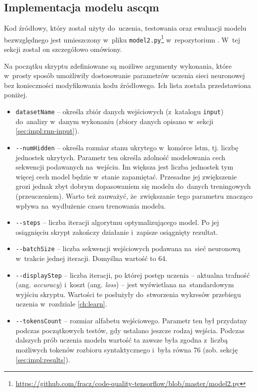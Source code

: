 \documentclass[twoside]{praca}
\begin{document}
\subsection{Implementacja modelu \gls{ascqm}}

\label{sec:impl:rnn:ascqm}

Kod źródłowy, który został użyty do~uczenia, testowania oraz ewaluacji modelu bezwzględnego jest umieszczony w~pliku \texttt{model2.py}\footnote{\url{https://github.com/fracz/code-quality-tensorflow/blob/master/model2.py}} w~repozytorium \cite{fracz:code-quality-tf}. W~tej sekcji został on szczegółowo omówiony.

Na początku skryptu zdefiniowane są możliwe argumenty wykonania, które w~prosty sposób umożliwiły dostosowanie parametrów uczenia sieci neuronowej bez konieczności modyfikowania kodu źródłowego. Ich lista została przedstawiona poniżej.

\begin{itemize}
    \item \texttt{datasetName} -- określa zbiór danych wejściowych (z~katalogu \texttt{input}) do~analizy w~danym wykonaniu (zbiory danych opisano w~sekcji \ref{sec:impl:rnn-input}).
    \item \texttt{-{}-numHidden} -- określa rozmiar stanu ukrytego w~komórce \gls{lstm}, tj. liczbę jednostek ukrytych. Parametr ten określa zdolność modelowania cech sekwencji podawanych na~wejściu. Im większa jest liczba jednostek tym więcej cech model będzie w~stanie zapamiętać. Przesadne jej zwiększenie grozi jednak zbyt dobrym dopasowaniem się modelu do~danych treningowych (przeuczeniem). Warto też zauważyć, że~zwiększanie tego parametru znacząco wpływa na~wydłużenie czasu trenowania modelu.
    \item \texttt{-{}-steps} -- liczba iteracji algorytmu optymalizującego model. Po jej osiągnięciu skrypt zakończy działanie i~zapisze osiągnięty rezultat.
    \item \texttt{-{}-batchSize} -- liczba sekwencji wejściowych podawana na~sieć neuronową w~trakcie jednej iteracji. Domyślna wartość to 64.
    \item \texttt{-{}-displayStep} -- liczba iteracji, po której postęp uczenia -- aktualna trafność (ang. \textit{accuracy}) i~koszt (ang. \textit{loss}) -- jest wyświetlana na~standardowym wyjściu skryptu. Wartości te posłużyły do~stworzenia wykresów przebiegu uczenia w~rozdziale \ref{ch:learn}.
    \item \texttt{-{}-tokensCount} -- rozmiar alfabetu wejściowego. Parametr ten był przydatny podczas początkowych testów, gdy ustalano jeszcze rodzaj wejścia. Podczas dalszych prób uczenia modelu wartość ta zawsze była zgodna z~liczbą możliwych tokenów rozbioru syntaktycznego i~była równa 76 (zob. sekcję \ref{sec:impl:results}).
\end{itemize}
\end{document}
